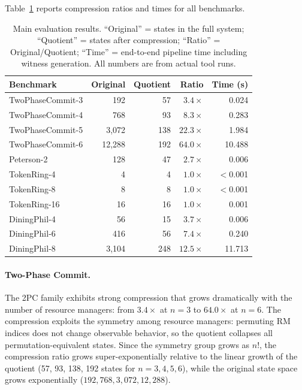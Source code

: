 \documentclass[11pt]{article}
\begin{document}
Table~\ref{tab:results} reports compression ratios and times for all
benchmarks.

\begin{table}[t]
\centering
\caption{Main evaluation results.
  ``Original'' = states in the full system; ``Quotient'' = states after
  compression; ``Ratio'' = Original/Quotient; ``Time'' = end-to-end
  pipeline time including witness generation.
  All numbers are from actual tool runs.}
\label{tab:results}
\small
\begin{tabular}{@{}lrrrr@{}}
\toprule
\textbf{Benchmark} & \textbf{Original} & \textbf{Quotient} &
  \textbf{Ratio} & \textbf{Time (s)} \\
\midrule
TwoPhaseCommit-3   &      192 &    57 &  $3.4\times$ &  0.024 \\
TwoPhaseCommit-4   &      768 &    93 &  $8.3\times$ &  0.283 \\
TwoPhaseCommit-5   &    3{,}072 &   138 & $22.3\times$ &  1.984 \\
TwoPhaseCommit-6   &   12{,}288 &   192 & $64.0\times$ & 10.488 \\
\midrule
Peterson-2         &      128 &    47 &  $2.7\times$ &  0.006 \\
\midrule
TokenRing-4        &        4 &     4 &  $1.0\times$ & $<$0.001 \\
TokenRing-8        &        8 &     8 &  $1.0\times$ & $<$0.001 \\
TokenRing-16       &       16 &    16 &  $1.0\times$ &  0.001 \\
\midrule
DiningPhil-4       &       56 &    15 &  $3.7\times$ &  0.006 \\
DiningPhil-6       &      416 &    56 &  $7.4\times$ &  0.240 \\
DiningPhil-8       &    3{,}104 &   248 & $12.5\times$ & 11.713 \\
\bottomrule
\end{tabular}
\end{table}

\paragraph{Two-Phase Commit.}
The 2PC family exhibits strong compression that grows dramatically with
the number of resource managers: from $3.4\times$ at $n = 3$ to
$64.0\times$ at $n = 6$.
The compression exploits the symmetry among resource managers: permuting
RM indices does not change observable behavior, so the quotient collapses
all permutation-equivalent states.
Since the symmetry group grows as $n!$, the compression ratio grows
super-exponentially relative to the linear growth of the quotient
(57, 93, 138, 192 states for $n = 3, 4, 5, 6$), while the original
state space grows exponentially ($192, 768, 3{,}072, 12{,}288$).
\end{document}
